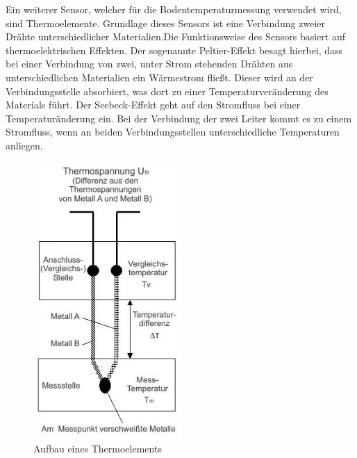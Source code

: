 Ein weiterer Sensor, welcher für die Bodentemperaturmessung verwendet wird,
sind Thermoelemente. Grundlage dieses Sensors ist eine Verbindung zweier Drähte
unterschiedlicher Materialien.Die Funktionsweise des Sensors basiert auf
thermoelektrischen Effekten. Der sogenannte Peltier-Effekt besagt hierbei, dass
bei einer Verbindung von zwei, unter Strom stehenden Drähten aus
unterschiedlichen Materialien ein Wärmestrom fließt. Dieser wird an der
Verbindungsstelle absorbiert, was dort zu einer Temperaturveränderung des
Materials führt. Der Seebeck-Effekt geht auf den Stromfluss bei einer
Temperaturänderung ein. Bei der Verbindung der zwei Leiter kommt es zu einem
Stromfluss, wenn an beiden Verbindungsstellen unterschiedliche Temperaturen
anliegen. \cite{bernhard2014thermoelemente}

\begin{figure}[ht]
	\centering
	\includegraphics[width=0.5\textwidth]{bilder/thermoelement.jpg}
	\caption[Aufbau Thermoelement]{Aufbau eines Thermoelements}
	\label{fig:thermoelement}
\end{figure}

